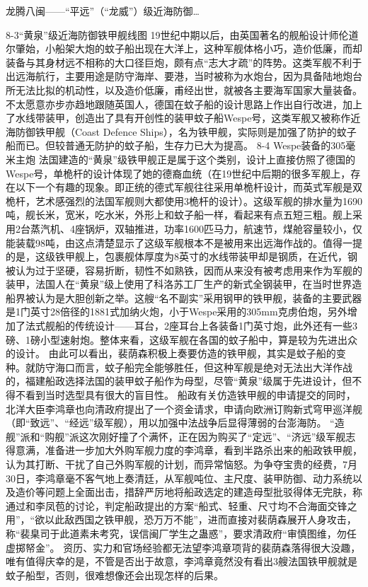 \documentclass[12pt,UTF8]{ctexbook}
\begin{document}
龙腾八闽——“平远”（“龙威”）级近海防御…

8-3“黄泉”级近海防御铁甲舰线图
19世纪中期以后，由英国著名的舰船设计师伦道尔肇始，小船架大炮的蚊子船出现在大洋上，这种军舰体格小巧，造价低廉，而却装备与其身材远不相称的大口径巨炮，颇有点“志大才疏”的阵势。这类军舰不利于出远海航行，主要用途是防守海岸、要港，当时被称为水炮台，因为具备陆地炮台所无法比拟的机动性，以及造价低廉，甫经出世，就被各主要海军国家大量装备。不太愿意亦步亦趋地跟随英国人，德国在蚊子船的设计思路上作出自行改进，加上了水线带装甲，创造出了具有开创性的装甲蚊子船Wespe号，这类军舰又被称作近海防御铁甲舰（Coast Defence Ships），名为铁甲舰，实际则是加强了防护的蚊子船而已。但较普通无防护的蚊子船，生存力已大为提高。
8-4 Wespe装备的305毫米主炮
法国建造的“黄泉”级铁甲舰正是属于这个类别，设计上直接仿照了德国的Wespe号，单桅杆的设计体现了她的德裔血统（在19世纪中后期的很多军舰上，存在以下一个有趣的现象。即正统的德式军舰往往采用单桅杆设计，而英式军舰是双桅杆，艺术感强烈的法国军舰则大都使用3桅杆的设计）。这级军舰的排水量为1690吨，舰长米，宽米，吃水米，外形上和蚊子船一样，看起来有点五短三粗。舰上采用2台蒸汽机、4座锅炉，双轴推进，功率1600匹马力，航速节，煤舱容量较小，仅能装载98吨，由这点清楚显示了这级军舰根本不是被用来出远海作战的。值得一提的是，这级铁甲舰上，包裹舰体厚度为8英寸的水线带装甲却是钢质，在近代，钢被认为过于坚硬，容易折断，韧性不如熟铁，因而从来没有被考虑用来作为军舰的装甲，法国人在“黄泉”级上使用了科洛苏工厂生产的新式全钢装甲，在当时世界造船界被认为是大胆创新之举。这艘“名不副实”采用钢甲的铁甲舰，装备的主要武器是1门英寸28倍径的1881式加纳火炮，小于Wespe采用的305mm克虏伯炮，另外增加了法式舰船的传统设计——耳台，2座耳台上各装备1门英寸炮，此外还有一些3磅、1磅小型速射炮。整体来看，这级军舰在各国的蚊子船中，算是较为先进出众的设计。
由此可以看出，裴荫森积极上奏要仿造的铁甲舰，其实是蚊子船的变种。就防守海口而言，蚊子船完全能够胜任，但这种军舰是绝对无法出大洋作战的，福建船政选择法国的装甲蚊子船作为母型，尽管“黄泉”级属于先进设计，但不得不看到当时选型具有很大的盲目性。
船政有关仿造铁甲舰的申请提交的同时，北洋大臣李鸿章也向清政府提出了一个资金请求，申请向欧洲订购新式穹甲巡洋舰（即“致远”、“经远”级军舰），用以加强中法战争后显得薄弱的台澎海防。 “造舰”派和“购舰”派这次刚好撞了个满怀，正在因为购买了“定远”、“济远”级军舰志得意满，准备进一步加大外购军舰力度的李鸿章，看到半路杀出来的船政铁甲舰，认为其打断、干扰了自己外购军舰的计划，而异常恼怒。为争夺宝贵的经费，7月30日，李鸿章毫不客气地上奏清廷，从军舰吨位、主尺度、装甲防御、动力系统以及造价等问题上全面出击，措辞严厉地将船政选定的建造母型批驳得体无完肤，称通过和李凤苞的讨论，判定船政提出的方案“船式、轻重、尺寸均不合海面交锋之用”，“欲以此敌西国之铁甲舰，恐万万不能”，进而直接对裴荫森展开人身攻击，称“裴臬司于此道素未考究，误信闽厂学生之蛊惑”，要求清政府“审慎图维，勿任虚掷帑金”。 资历、实力和官场经验都无法望李鸿章项背的裴荫森落得很大没趣，唯有值得庆幸的是，不管是否出于故意，李鸿章竟然没有看出3艘法国铁甲舰就是蚊子船型，否则，很难想像还会出现怎样的后果。
\end{document}
